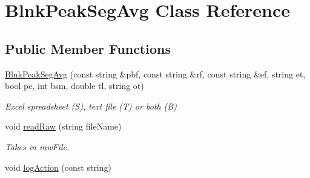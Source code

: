 \hypertarget{classBlnkPeakSegAvg}{}\section{Blnk\+Peak\+Seg\+Avg Class Reference}
\label{classBlnkPeakSegAvg}
\subsection*{Public Member Functions}
\begin{DoxyCompactItemize}
\item 
\mbox{\label{classBlnkPeakSegAvg_a522224844b99bef664fcb2e5d6199c6c}} 
\hyperlink{classBlnkPeakSegAvg_a522224844b99bef664fcb2e5d6199c6c}{Blnk\+Peak\+Seg\+Avg} (const string \&pbf, const string \&rf, const string \&ef, string et, bool pe, int bsm, double tl, string ot)
\begin{DoxyCompactList}\small\item\em Excel spreadsheet (\textquotesingle{}S\textquotesingle{}), text file (\textquotesingle{}T\textquotesingle{}) or both (\textquotesingle{}B\textquotesingle{}) \end{DoxyCompactList}\item 
void \hyperlink{classBlnkPeakSegAvg_a34445db61572d19462bfc5f1d647f332}{read\+Raw} (string file\+Name)
\begin{DoxyCompactList}\small\item\em Takes in raw\+File. \end{DoxyCompactList}\item 
void \hyperlink{classBlnkPeakSegAvg_ac6acee0554ddea948407e294c7a21eff}{log\+Action} (const string)
\end{DoxyCompactItemize}
